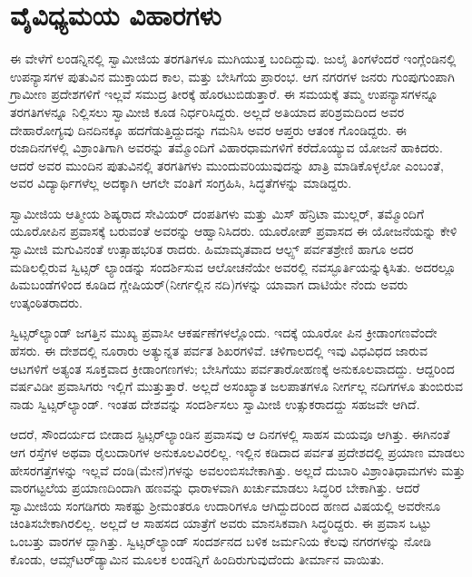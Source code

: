 
\chapter{ವೈವಿಧ್ಯಮಯ ವಿಹಾರಗಳು}

\noindent

ಈ ವೇಳೆಗೆ ಲಂಡನ್ನಿನಲ್ಲಿ ಸ್ವಾಮೀಜಿಯ ತರಗತಿಗಳೂ ಮುಗಿಯುತ್ತ ಬಂದಿದ್ದುವು. ಜುಲೈ ತಿಂಗಳೆಂದರೆ ಇಂಗ್ಲೆಂಡಿನಲ್ಲಿ ಉಪನ್ಯಾಸಗಳ ಪುತುವಿನ ಮುಕ್ತಾಯದ ಕಾಲ, ಮತ್ತು ಬೇಸಿಗೆಯ ಪ್ರಾರಂಭ. ಆಗ ನಗರಗಳ ಜನರು ಗುಂಪುಗುಂಪಾಗಿ ಗ್ರಾಮೀಣ ಪ್ರದೇಶಗಳಿಗೆ ಇಲ್ಲವೆ ಸಮುದ್ರ ತೀರಕ್ಕೆ ಹೊರಟುಬಿಡುತ್ತಾರೆ. ಈ ಸಮಯಕ್ಕೆ ತಮ್ಮ ಉಪನ್ಯಾಸಗಳನ್ನೂ ತರಗತಿಗಳನ್ನೂ ನಿಲ್ಲಿಸಲು ಸ್ವಾಮೀಜಿ ಕೂಡ ನಿರ್ಧರಿಸಿದ್ದರು. ಅಲ್ಲದೆ ಅತಿಯಾದ ಪರಿಶ್ರಮದಿಂದ ಅವರ ದೇಹಾರೋಗ್ಯವು ದಿನದಿನಕ್ಕೂ ಹದಗೆಡುತ್ತಿದ್ದುದನ್ನು ಗಮನಿಸಿ ಅವರ ಆಪ್ತರು ಆತಂಕ ಗೊಂಡಿದ್ದರು. ಈ ರಜಾದಿನಗಳಲ್ಲಿ ವಿಶ್ರಾಂತಿಗಾಗಿ ಅವರನ್ನು ತಮ್ಮೊಂದಿಗೆ ವಿಹಾರಧಾಮಗಳಿಗೆ ಕರೆದೊಯ್ಯುವ ಯೋಜನೆ ಹಾಕಿದರು. ಆದರೆ ಅವರ ಮುಂದಿನ ಪುತುವಿನಲ್ಲಿ ತರಗತಿಗಳು ಮುಂದುವರಿಯುವುದನ್ನು ಖಾತ್ರಿ ಮಾಡಿಕೊಳ್ಳಲೋ ಎಂಬಂತೆ, ಅವರ ವಿದ್ಯಾರ್ಥಿಗಳೆಲ್ಲ ಅದಕ್ಕಾಗಿ ಆಗಲೇ ವಂತಿಗೆ ಸಂಗ್ರಹಿಸಿ, ಸಿದ್ಧತೆಗಳನ್ನು ಮಾಡಿದ್ದರು.

ಸ್ವಾಮೀಜಿಯ ಆತ್ಮೀಯ ಶಿಷ್ಯರಾದ ಸೇವಿಯರ್ ದಂಪತಿಗಳು ಮತ್ತು ಮಿಸ್ ಹೆನ್ರಿಟಾ ಮುಲ್ಲರ್, ತಮ್ಮೊಂದಿಗೆ ಯೂರೋಪಿನ ಪ್ರವಾಸಕ್ಕೆ ಬರುವಂತೆ ಅವರನ್ನು ಆಹ್ವಾನಿಸಿದರು. ಯೂರೋಪ್ ಪ್ರವಾಸದ ಈ ಯೋಜನೆಯನ್ನು ಕೇಳಿ ಸ್ವಾಮೀಜಿ ಮಗುವಿನಂತೆ ಉತ್ಸಾಹಭರಿತ ರಾದರು. ಹಿಮಾಮೃತವಾದ ಆಲ್ಪ್ಸ್ ಪರ್ವತಶ್ರೇಣಿ ಹಾಗೂ ಅದರ ಮಡಿಲಲ್ಲಿರುವ ಸ್ವಿಟ್ಸರ್ ಲ್ಯಾಂಡನ್ನು ಸಂದರ್ಶಿಸುವ ಆಲೋಚನೆಯೇ ಅವರಲ್ಲಿ ನವಸ್ಫೂರ್ತಿಯನ್ನುಕ್ಕಿಸಿತು. ಅದರಲ್ಲೂ ಹಿಮಬಂಡೆಗಳಿಂದ ಕೂಡಿದ ಗ್ಲೇಷಿಯರ್​(ನೀರ್ಗಲ್ಲಿನ ನದಿ)ಗಳನ್ನು ಯಾವಾಗ ದಾಟಿಯೇ ನೆಂದು ಅವರು ಉತ್ಕಂಠಿತರಾದರು.

ಸ್ವಿಟ್ಸರ್​ಲ್ಯಾಂಡ್ ಜಗತ್ತಿನ ಮುಖ್ಯ ಪ್ರವಾಸೀ ಆಕರ್ಷಣೆಗಳಲ್ಲೊಂದು. ಇದಕ್ಕೆ ಯೂರೋ ಪಿನ ಕ್ರೀಡಾಂಗಣವೆಂದೇ ಹೆಸರು. ಈ ದೇಶದಲ್ಲಿ ನೂರಾರು ಅತ್ಯುನ್ನತ ಪರ್ವತ ಶಿಖರಗಳಿವೆ. ಚಳಿಗಾಲದಲ್ಲಿ ಇವು ವಿಧವಿಧದ ಜಾರುವ ಆಟಗಳಿಗೆ ಅತ್ಯಂತ ಸೂಕ್ತವಾದ ಕ್ರೀಡಾಂಗಣಗಳು; ಬೇಸಿಗೆಯು ಪರ್ವತಾರೋಹಣಕ್ಕೆ ಅನುಕೂಲವಾದದ್ದು. ಆದ್ದರಿಂದ ವರ್ಷವಿಡೀ ಪ್ರವಾಸಿಗರು ಇಲ್ಲಿಗೆ ಮುತ್ತುತ್ತಾರೆ. ಅಲ್ಲದೆ ಅಸಂಖ್ಯಾತ ಜಲಪಾತಗಳೂ ನೀರ್ಗಲ್ಲ ನದಿಗಗಳೂ ತುಂಬಿರುವ ನಾಡು ಸ್ವಿಟ್ಸರ್​ಲ್ಯಾಂಡ್. ಇಂತಹ ದೇಶವನ್ನು ಸಂದರ್ಶಿಸಲು ಸ್ವಾಮೀಜಿ ಉತ್ಸುಕರಾದದ್ದು ಸಹಜವೇ ಆಗಿದೆ.

ಆದರೆ, ಸೌಂದರ್ಯದ ಬೀಡಾದ ಸ್ಟಿಟ್ಸರ್​ಲ್ಯಾಂಡಿನ ಪ್ರವಾಸವು ಆ ದಿನಗಳಲ್ಲಿ ಸಾಹಸ ಮಯವೂ ಆಗಿತ್ತು. ಈಗಿನಂತೆ ಆಗ ರಸ್ತೆಗಳ ಅಥವಾ ರೈಲುದಾರಿಗಳ ಅನುಕೂಲವಿರಲಿಲ್ಲ. ಇಲ್ಲಿನ ಕಡಿದಾದ ಪರ್ವತ ಪ್ರದೇಶದಲ್ಲಿ ಪ್ರಯಾಣ ಮಾಡಲು ಹೇಸರಗತ್ತೆಗಳನ್ನು ಇಲ್ಲವೆ ದಂಡಿ(ಮೇನೆ)ಗಳನ್ನು ಅವಲಂಬಿಸಬೇಕಾಗಿತ್ತು. ಅಲ್ಲದೆ ದುಬಾರಿ ವಿಶ್ರಾಂತಿಧಾಮಗಳು ಮತ್ತು ವಾರಗಟ್ಟಲೆಯ ಪ್ರಯಾಣದಿಂದಾಗಿ ಹಣವನ್ನು ಧಾರಾಳವಾಗಿ ಖರ್ಚುಮಾಡಲು ಸಿದ್ಧರಿರ ಬೇಕಾಗಿತ್ತು. ಆದರೆ ಸ್ವಾಮೀಜಿಯ ಸಂಗಡಿಗರು ಸಾಕಷ್ಟು ಶ್ರೀಮಂತರೂ ಉದಾರಿಗಳೂ ಆಗಿದ್ದುದರಿಂದ ಹಣದ ವಿಷಯಲ್ಲಿ ಅವರೇನೂ ಚಿಂತಿಸಬೇಕಾಗಿರಲಿಲ್ಲ. ಅಲ್ಲದೆ ಆ ಸಾಹಸದ ಯಾತ್ರೆಗೆ ಅವರು ಮಾನಸಿಕವಾಗಿ ಸಿದ್ಧರಿದ್ದರು. ಈ ಪ್ರವಾಸ ಒಟ್ಟು ಒಂಬತ್ತು ವಾರಗಳ ದ್ದಾಗಿತ್ತು. ಸ್ವಿಟ್ಸರ್​ಲ್ಯಾಂಡ್ ಸಂದರ್ಶನದ ಬಳಿಕ ಜರ್ಮನಿಯ ಕೆಲವು ನಗರಗಳನ್ನು ನೋಡಿ ಕೊಂಡು, ಆಮ್ಸ್​ಟರ್​ಡ್ಯಾಮಿನ ಮೂಲಕ ಲಂಡನ್ನಿಗೆ ಹಿಂದಿರುಗುವುದೆಂದು ತೀರ್ಮಾನ ವಾಯಿತು.

